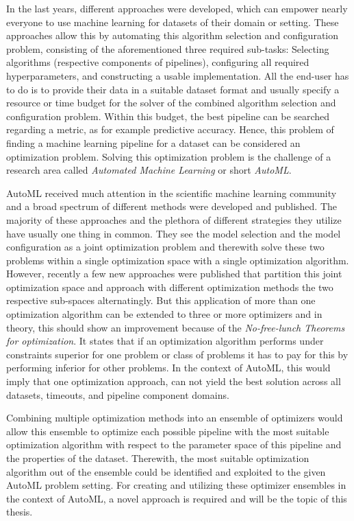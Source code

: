 In the last years, different approaches were developed, which can empower nearly everyone to use machine learning for datasets of their domain or setting.
These approaches allow this by automating this algorithm selection and configuration problem, consisting of the aforementioned three required sub-tasks: Selecting algorithms (respective components of pipelines), configuring all required hyperparameters, and constructing a usable implementation.
All the end-user has to do is to provide their data in a suitable dataset format and usually specify a resource or time budget for the solver of the combined algorithm selection and configuration problem.\newline
Within this budget, the best pipeline can be searched regarding a metric, as for example predictive accuracy.
Hence, this problem of finding a machine learning pipeline for a dataset can be considered an optimization problem.
Solving this optimization problem is the challenge of a research area called \textit{Automated Machine Learning} or short \textit{AutoML}.

AutoML received much attention in the scientific machine learning community and a broad spectrum of different methods were developed and published.
The majority of these approaches and the plethora of different strategies they utilize have usually one thing in common.
They see the model selection and the model configuration as a joint optimization problem and therewith solve these two problems within a single optimization space with a single optimization algorithm.\newline
However, recently a few new approaches were published that partition this joint optimization space and approach with different optimization methods the two respective sub-spaces alternatingly.
But this application of more than one optimization algorithm can be extended to three or more optimizers and in theory, this should show an improvement because of the \textit{No-free-lunch Theorems for optimization}.
It states that if an optimization algorithm performs under constraints superior for one problem or class of problems it has to pay for this by performing inferior for other problems.
In the context of AutoML, this would imply that one optimization approach, can not yield the best solution across all datasets, timeouts, and pipeline component domains.

Combining multiple optimization methods into an ensemble of optimizers would allow this ensemble to optimize each possible pipeline with the most suitable optimization algorithm with respect to the parameter space of this pipeline and the properties of the dataset.
Therewith, the most suitable optimization algorithm out of the ensemble could be identified and exploited to the given AutoML problem setting.\newline
For creating and utilizing these optimizer ensembles in the context of AutoML, a novel approach is required and will be the topic of this thesis. 


